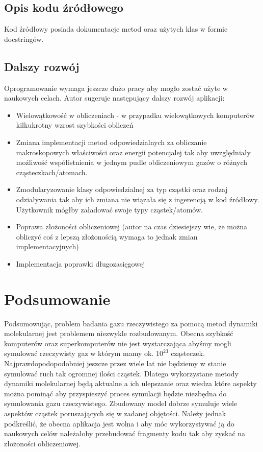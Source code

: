 \documentclass[a4paper,10pt]{article}
\begin{document}
\subsection{Opis kodu źródłowego}
Kod źródłowy posiada dokumentacje metod oraz użytych klas w formie docstringów. 

\subsection{Dalszy rozwój}
Oprogramowanie wymaga jeszcze dużo pracy aby mogło zostać użyte w naukowych celach. Autor sugeruje następujący dalszy rozwój aplikacji:

\begin{itemize}
\item Wielowątkowość w obliczeniach - w przypadku wielowątkowych komputerów kilkukrotny wzrost szybkości obliczeń
\item Zmiana implementacji metod odpowiedzialnych za obliczanie makroskopowych właściwości oraz energii potencjalej tak aby uwzględniały możliwość współistnienia w jednym pudle obliczeniowym gazów o różnych cząsteczkach/atomach.
\item Zmodularyzowanie klasy odpowiedzialnej za typ cząstki oraz rodzaj odziaływania tak aby ich zmiana nie wiązała się z ingerencją w kod źródłowy. Użytkownik mógłby załadować swoje typy cząstek/atomów.
\item Poprawa złożoności obliczeniowej (autor na czas dziesiejszy wie, że można obliczyć coś z lepszą złożonością wymaga to jednak zmian implementacyjnych)
\item Implementacja poprawki długozasięgowej
\end{itemize}


\section{Podsumowanie}
Podsumowując, problem badania gazu rzeczywistego za pomocą metod dynamiki molekularnej jest problemem niezwykle rozbudowanym. Obecna szybkość komputerów oraz superkomputerów nie jest wystarczająca abyśmy mogli symulować rzeczywisty gaz w którym mamy ok. $10^{23}$ cząsteczek. Najprawdopodopodobniej jeszcze przez wiele lat nie będziemy w stanie symulować ruch tak ogromnej ilości cząstek. Dlatego wykorzystane metody dynamiki molekularnej będą aktualne a ich ulepszanie oraz wiedza które aspekty można pominąć aby przyspieszyć proces symulacji będzie niezbędna do symulowania gazu rzeczywistego. Zbudowany model dobrze symuluje wiele aspektów cząstek poruszających się w zadanej objętości. Należy jednak podkreślić, że obecna aplikacja jest wolna i aby móc wykorzystywać ją do naukowych celów należałoby przebudować fragmenty kodu tak aby zyskać na złożoności obliczeniowej.
\end{document}

